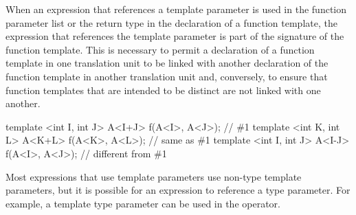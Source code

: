 \pnum
When an expression that references a template parameter is used in the
function parameter list or the return type in the declaration of a
function template, the expression that references the template
parameter is part of the signature of the function template.
This is
necessary to permit a declaration of a function template in one
translation unit to be linked with another declaration of the function
template in another translation unit and, conversely, to ensure that
function templates that are intended to be distinct are not linked
with one another.
\begin{example}
\begin{codeblock}
template <int I, int J> A<I+J> f(A<I>, A<J>);   // \#1
template <int K, int L> A<K+L> f(A<K>, A<L>);   // same as \#1
template <int I, int J> A<I-J> f(A<I>, A<J>);   // different from \#1
\end{codeblock}
\end{example}
\begin{note}
Most expressions that use template parameters use non-type template
parameters, but it is possible for an expression to reference a type
parameter.
For example, a template type parameter can be used in the
 operator.
\end{note}

